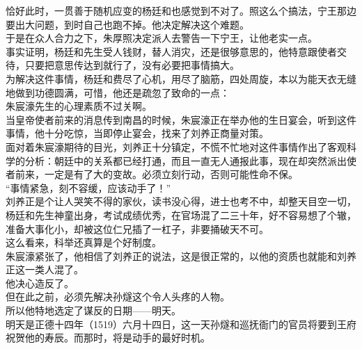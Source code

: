 \begin{multicols}{\theparacolNo}
恰好此时，一贯善于随机应变的杨廷和也感觉到不对了。照这么个搞法，宁王那边要出大问题，到时自己也跑不掉。他决定解决这个难题。\\

于是在众人合力之下，朱厚照决定派人去警告一下宁王，让他老实一点。\\

事实证明，杨廷和先生受人钱财，替人消灾，还是很够意思的，他特意跟使者交待，只要把意思传达到就行了，没有必要把事情搞大。\\

为解决这件事情，杨廷和费尽了心机，用尽了脑筋，四处周旋，本以为能天衣无缝地做到功德圆满，可惜，他还是疏忽了致命的一点：\\

朱宸濠先生的心理素质不过关啊。\\

当皇帝使者前来的消息传到南昌的时候，朱宸濠正在举办他的生日宴会，听到这件事情，他十分吃惊，当即停止宴会，找来了刘养正商量对策。\\

面对着朱宸濠期待的目光，刘养正十分镇定，不慌不忙地对这件事情作出了客观科学的分析：朝廷中的关系都已经打通，而且一直无人通报此事，现在却突然派出使者前来，一定是有了大的变故。必须立刻行动，否则可能性命不保。\\

“事情紧急，刻不容缓，应该动手了！”\\

刘养正是个让人哭笑不得的家伙，读书没心得，进士也考不中，却整天目空一切，杨廷和先生神童出身，考试成绩优秀，在官场混了二三十年，好不容易想了个辙，准备大事化小，却被这位仁兄插了一杠子，非要捅破天不可。\\

这么看来，科举还真算是个好制度。\\

朱宸濠紧张了，他相信了刘养正的说法，这是很正常的，以他的资质也就能和刘养正这一类人混了。\\

他决心造反了。\\

但在此之前，必须先解决孙燧这个令人头疼的人物。\\

所以他特地选定了谋反的日期——明天。\\

明天是正德十四年（1519）六月十四日，这一天孙燧和巡抚衙门的官员将要到王府祝贺他的寿辰。而那时，将是动手的最好时机。\\


\end{multicols}

